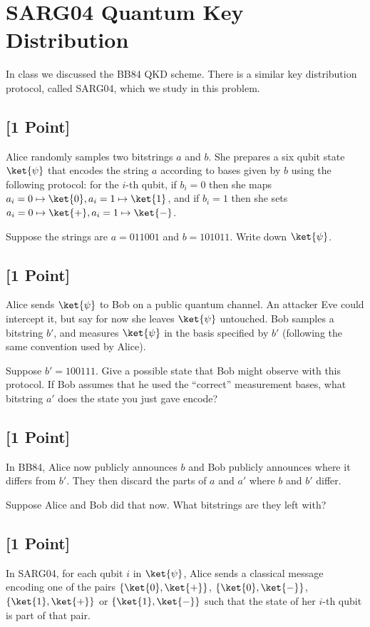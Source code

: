 \documentclass[11pt]{article}
\begin{document}
\section{SARG04 Quantum Key Distribution}

In class we discussed the BB84 QKD scheme. There is a similar key distribution protocol, called SARG04, which we study in this problem.

\subsection{[1 Point]} Alice randomly samples two bitstrings $a$ and $b$. She prepares a six qubit state $\ket{\psi}$ that encodes the string $a$ according to bases given by $b$ using the following protocol: for the $i$-th qubit, if $b_i = 0$ then she maps $a_i=0\mapsto\ket{0},a_i=1\mapsto\ket{1}$, and if $b_i = 1$ then she sets $a_i=0\mapsto\ket{+},a_i=1\mapsto\ket{-}$. 

Suppose the strings are $a = 011001$ and $b = 101011$. Write down $\ket{\psi}$.

\subsection{[1 Point]} Alice sends $\ket{\psi}$ to Bob on a public quantum channel. An attacker Eve could intercept it, but say for now she leaves $\ket{\psi}$ untouched. Bob samples a bitstring $b'$, and measures $\ket{\psi}$ in the basis specified by $b'$ (following the same convention used by Alice). 

Suppose $b'=100111$. Give a possible state that Bob might observe with this protocol. 
If Bob assumes that he used the ``correct'' measurement bases, what bitstring $a'$ does the state you just gave encode?


\subsection{[1 Point]} In BB84, Alice now publicly announces $b$ and Bob publicly announces where it differs from $b'$. They then discard the parts of $a$ and $a'$ where $b$ and $b'$ differ. 

Suppose Alice and Bob did that now. What bitstrings are they left with?


\subsection{[1 Point]} In SARG04, for each qubit $i$ in $\ket{\psi}$, Alice sends a classical message encoding one of the pairs $\{\ket{0}, \ket{+}\}$, $\{\ket{0}, \ket{-}\}$, $\{\ket{1}, \ket{+}\}$ or $\{\ket{1}, \ket{-}\}$ such that the state of her $i$-th qubit is part of that pair. 
\end{document}
